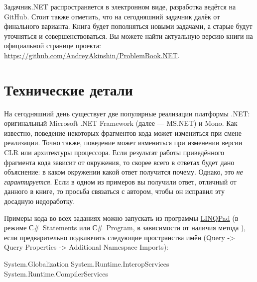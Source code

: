 Задачник.NET распространяется в электронном виде, разработка ведётся на GitHub. Стоит также отметить, что на сегодняшний задачник далёк от финального варианта. Книга будет пополняться новыми задачами, а старые будут уточняться и совершенствоваться. Вы можете найти актуальную версию книги на официальной странице проекта: \url{https://github.com/AndreyAkinshin/ProblemBook.NET}.

\newpage
\section*{Технические детали}
На сегодняшний день существует две популярные реализации платформы .NET: оригинальный Microsoft .NET Framework (далее — MS.NET) и Mono. Как известно, поведение некоторых фрагментов кода может измениться при смене реализации. Точно также, поведение может измениться при изменении версии CLR или архитектуры процессора. Если результат работы приведённого фрагмента кода зависит от окружения, то скорее всего в ответах будет дано объяснение: в каком окружении какой ответ получится почему. Однако, это \textit{не гарантируется}. Если в одном из примеров вы получили ответ, отличный от данного в книге, то просьба связаться с автором, чтобы он исправил эту досадную недоработку.

Примеры кода во всех заданиях можно запускать из программы \href{http://www.linqpad.net/}{LINQPad} (в режиме С\#~Statements или С\#~Program, в зависимости от наличия метода ), если предварительно подключить следующие пространства имён (Query ->  Query Properties -> Additional Namespace Imports):
\begin{source}
System.Globalization
System.Runtime.InteropServices
System.Runtime.CompilerServices
\end{source}
